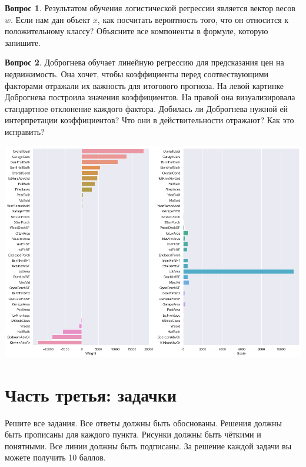 \documentclass[12pt]{article}
\theoremstyle{definition}
\newtheorem{question}{Вопрос}
\begin{document}
\vspace{4cm} 


\begin{question}
Результатом обучения логистической регрессии является вектор весов $w$. Если нам дан объект $x$, как посчитать вероятность того, что он относится к положительному классу? Объясните все компоненты в формуле, которую запишите.
\end{question}


\newpage 

\begin{question}
Доброгнева обучает линейную регрессию для предсказания цен на недвижимость. Она хочет, чтобы коэффициенты перед соотвествующими факторами отражали их важность для итогового прогноза. На левой картинке Доброгнева построила значения коэффициентов. На правой она визуализировала стандартное отклонение каждого фактора. Добилась ли Доброгнева нужной ей интерпретации коэффициентов? Что они в действительности отражают? Как это исправить? 

\begin{center}
  \includegraphics[scale=0.5]{scale.png}
\end{center}
\end{question}


\newpage 


\section*{Часть третья: задачки}

Решите все задания. Все ответы должны быть обоснованы. Решения должны быть прописаны для каждого пункта. Рисунки должны быть чёткими и понятными. Все линии должны быть подписаны. За решение каждой задачи вы можете получить 10 баллов.
\end{document}
